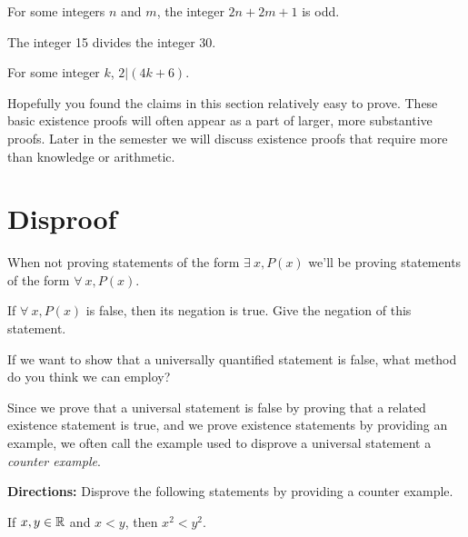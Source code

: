 \vspace{1.5in}

\begin{claim} For some integers $n$ and $m$, the integer $2n+2m+1$ is odd.
\end{claim}

\vspace{1.5in}

\begin{claim} The integer 15 divides the integer 30.
\end{claim}

\vspace{1.5in}

\begin{claim} For some integer $k$, $2|(4k+6)$.
\end{claim}


\vspace{1.5in}


\noindent Hopefully you found the claims in this section relatively easy to prove.  These basic existence proofs will often appear as a part of larger, more substantive proofs.  Later in the semester we will discuss existence proofs that require more than knowledge or arithmetic.

\section{Disproof}

When not proving statements of the form $\exists \ x, P(x)$ we'll be proving statements of the form $\forall \ x, P(x)$.

\begin{question}[resume]
\item If $\forall \ x, P(x)$ is false, then its negation is true.  Give the negation of this statement.
\vspace{.5in}
\item If we want to show that a universally quantified statement is false, what method do you think we can employ?
\vspace{.75in}
\end{question}

\noindent Since we prove that a universal statement is false by proving that a related existence statement is true, and we prove existence statements by providing an example, we often call the example used to disprove a universal statement a \textit{counter example}.\\


\begin{question}[resume]
\item \textbf{Directions:} Disprove the following statements by providing a counter example.
\end{question}
\begin{claim} If $x,y \in \mathbb{R}$ and $x<y$, then $x^2<y^2$.
\end{claim}

